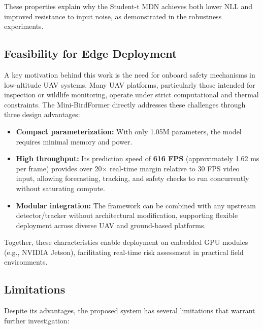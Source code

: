 \documentclass[journal]{IEEEtran}
\begin{document}
These properties explain why the Student-t MDN achieves both lower NLL and improved resistance to input noise, as demonstrated in the robustness experiments.

\subsection{Feasibility for Edge Deployment}

A key motivation behind this work is the need for onboard safety mechanisms in low-altitude UAV systems. Many UAV platforms, particularly those intended for inspection or wildlife monitoring, operate under strict computational and thermal constraints. The Mini-BirdFormer directly addresses these challenges through three design advantages:

\begin{itemize}
	\item \textbf{Compact parameterization:} With only 1.05M parameters, the model requires minimal memory and power.
	\item \textbf{High throughput:} Its prediction speed of \textbf{616 FPS} (approximately 1.62 ms per frame) provides over 20$\times$ real-time margin relative to 30 FPS video input, allowing forecasting, tracking, and safety checks to run concurrently without saturating compute.
	\item \textbf{Modular integration:} The framework can be combined with any upstream detector/tracker without architectural modification, supporting flexible deployment across diverse UAV and ground-based platforms.
\end{itemize}

Together, these characteristics enable deployment on embedded GPU modules (e.g., NVIDIA Jetson), facilitating real-time risk assessment in practical field environments.

\subsection{Limitations}

Despite its advantages, the proposed system has several limitations that warrant further investigation:
\end{document}
